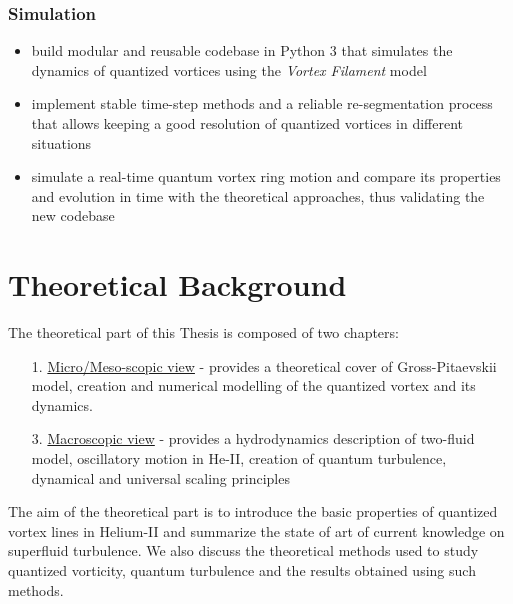 	\subsection*{Simulation}
	\begin{itemize}
		\item build modular and reusable codebase in Python 3 that simulates the dynamics of quantized vortices using the \textit{Vortex Filament} model
		\item implement stable time-step methods and a reliable re-segmentation process that allows keeping a good resolution of quantized vortices in different situations
		\item simulate a real-time quantum vortex ring motion and compare its properties and evolution in time with the theoretical approaches, thus validating the new codebase
	\end{itemize}

\newpage


\chapter{Theoretical Background}

The theoretical part of this Thesis is composed of two chapters:

\begin{itemize}
	\item[1.] \underline{Micro/Meso-scopic view} - provides a theoretical cover of Gross-Pitaevskii model, creation and numerical modelling of the quantized vortex and its dynamics.

	\item[3.] \underline{Macroscopic view} - provides a hydrodynamics description of two-fluid model, oscillatory motion in He-II, creation of quantum turbulence, dynamical and universal scaling principles

\end{itemize}

The aim of the theoretical part is to introduce the basic properties of quantized vortex lines in Helium-II and summarize the state of art of current knowledge on superfluid turbulence. We also discuss the theoretical methods used to study quantized vorticity, quantum turbulence and the results obtained using such methods.

